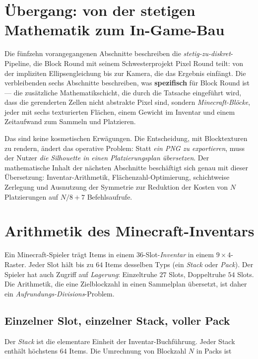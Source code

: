 \documentclass[12pt,a4paper]{scrartcl}
\newcommand{\acc}[1]{\textcolor{accent}{\textbf{#1}}}
\begin{document}
\section{Übergang: von der stetigen Mathematik zum In-Game-Bau}

Die fünfzehn vorangegangenen Abschnitte beschreiben die \emph{stetig-zu-diskret}-Pipeline, die Block Round mit seinem Schwesterprojekt Pixel Round teilt: von der impliziten Ellipsengleichung bis zur Kamera, die das Ergebnis einfängt. Die verbleibenden sechs Abschnitte beschreiben, was \acc{spezifisch} für Block Round ist --- die zusätzliche Mathematikschicht, die durch die Tatsache eingeführt wird, dass die gerenderten Zellen nicht abstrakte Pixel sind, sondern \emph{Minecraft-Blöcke}, jeder mit sechs texturierten Flächen, einem Gewicht im Inventar und einem Zeitaufwand zum Sammeln und Platzieren.

Das sind keine kosmetischen Erwägungen. Die Entscheidung, mit Blocktexturen zu rendern, ändert das operative Problem: Statt \emph{ein PNG zu exportieren}, muss der Nutzer \emph{die Silhouette in einen Platzierungsplan übersetzen}. Der mathematische Inhalt der nächsten Abschnitte beschäftigt sich genau mit dieser Übersetzung: Inventar-Arithmetik, Flächenzahl-Optimierung, schichtweise Zerlegung und Ausnutzung der Symmetrie zur Reduktion der Kosten von $N$ Platzierungen auf $N/8 + 7$ Befehlsaufrufe.

\clearpage

\section{Arithmetik des Minecraft-Inventars}

Ein Minecraft-Spieler trägt Items in einem 36-Slot-\emph{Inventar} in einem $9 \times 4$-Raster. Jeder Slot hält bis zu $64$ Items desselben Typs (ein \emph{Stack} oder \emph{Pack}). Der Spieler hat auch Zugriff auf \emph{Lagerung}: Einzeltruhe $27$ Slots, Doppeltruhe $54$ Slots. Die Arithmetik, die eine Zielblockzahl in einen Sammelplan übersetzt, ist daher ein \emph{Aufrundungs-Divisions}-Problem.

\subsection{Einzelner Slot, einzelner Stack, voller Pack}
Der \emph{Stack} ist die elementare Einheit der Inventar-Buchführung. Jeder Stack enthält höchstens $64$ Items. Die Umrechnung von Blockzahl $N$ in Packs ist
\end{document}
